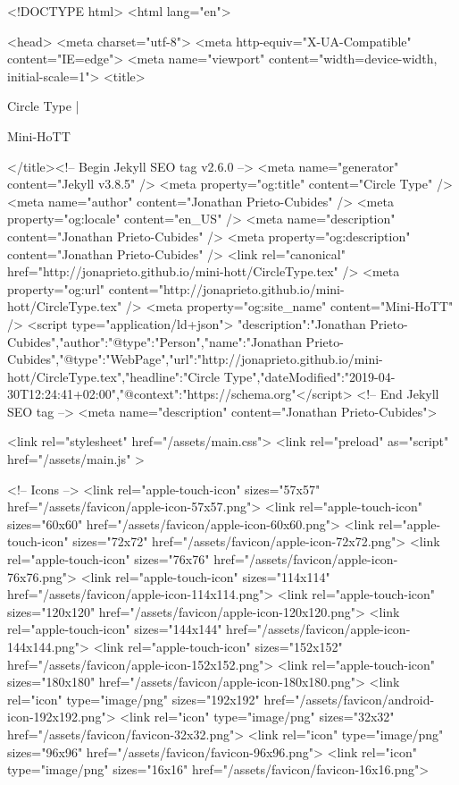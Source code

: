 <!DOCTYPE html>
<html lang="en">

<head>
  <meta charset="utf-8">
  <meta http-equiv="X-UA-Compatible" content="IE=edge">
  <meta name="viewport" content="width=device-width, initial-scale=1">
  <title>
    
      
        Circle Type |
      
        Mini-HoTT
    
  </title><!-- Begin Jekyll SEO tag v2.6.0 -->
<meta name="generator" content="Jekyll v3.8.5" />
<meta property="og:title" content="Circle Type" />
<meta name="author" content="Jonathan Prieto-Cubides" />
<meta property="og:locale" content="en_US" />
<meta name="description" content="Jonathan Prieto-Cubides" />
<meta property="og:description" content="Jonathan Prieto-Cubides" />
<link rel="canonical" href="http://jonaprieto.github.io/mini-hott/CircleType.tex" />
<meta property="og:url" content="http://jonaprieto.github.io/mini-hott/CircleType.tex" />
<meta property="og:site_name" content="Mini-HoTT" />
<script type="application/ld+json">
{"description":"Jonathan Prieto-Cubides","author":{"@type":"Person","name":"Jonathan Prieto-Cubides"},"@type":"WebPage","url":"http://jonaprieto.github.io/mini-hott/CircleType.tex","headline":"Circle Type","dateModified":"2019-04-30T12:24:41+02:00","@context":"https://schema.org"}</script>
<!-- End Jekyll SEO tag -->
<meta name="description" content="Jonathan Prieto-Cubides">

  <link rel="stylesheet" href="/assets/main.css">
  <link rel="preload" as="script" href="/assets/main.js" >

  <!-- Icons -->
  <link rel="apple-touch-icon" sizes="57x57" href="/assets/favicon/apple-icon-57x57.png">
  <link rel="apple-touch-icon" sizes="60x60" href="/assets/favicon/apple-icon-60x60.png">
  <link rel="apple-touch-icon" sizes="72x72" href="/assets/favicon/apple-icon-72x72.png">
  <link rel="apple-touch-icon" sizes="76x76" href="/assets/favicon/apple-icon-76x76.png">
  <link rel="apple-touch-icon" sizes="114x114" href="/assets/favicon/apple-icon-114x114.png">
  <link rel="apple-touch-icon" sizes="120x120" href="/assets/favicon/apple-icon-120x120.png">
  <link rel="apple-touch-icon" sizes="144x144" href="/assets/favicon/apple-icon-144x144.png">
  <link rel="apple-touch-icon" sizes="152x152" href="/assets/favicon/apple-icon-152x152.png">
  <link rel="apple-touch-icon" sizes="180x180" href="/assets/favicon/apple-icon-180x180.png">
  <link rel="icon" type="image/png" sizes="192x192"  href="/assets/favicon/android-icon-192x192.png">
  <link rel="icon" type="image/png" sizes="32x32" href="/assets/favicon/favicon-32x32.png">
  <link rel="icon" type="image/png" sizes="96x96" href="/assets/favicon/favicon-96x96.png">
  <link rel="icon" type="image/png" sizes="16x16" href="/assets/favicon/favicon-16x16.png">

